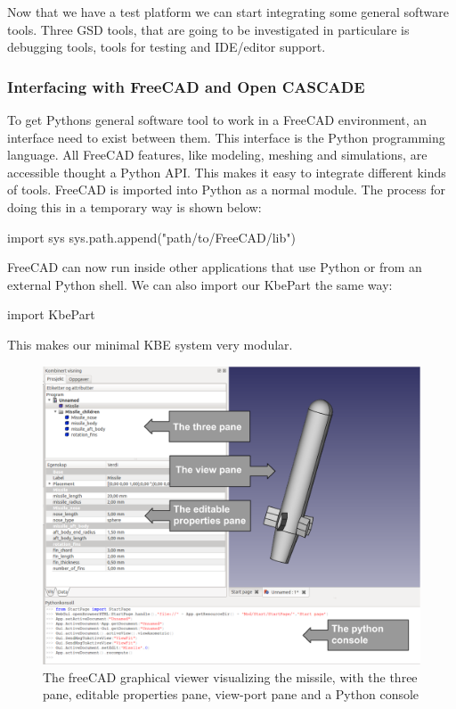 Now that we have a test platform we can start integrating some general software tools. Three GSD tools, that are going to be investigated in particulare is debugging tools, tools for testing and IDE/editor support.


\subsubsection{Interfacing with FreeCAD and Open CASCADE} %
\label{ssub:Interfacing with FreeCAD}

To get Pythons general software tool to work in a FreeCAD environment, an interface need to exist between them. This interface is the Python programming language. All FreeCAD features, like modeling, meshing and simulations, are accessible thought a Python API. This makes it easy to integrate different kinds of tools. FreeCAD is imported into Python as a normal module. The process for doing this in a temporary way is shown below:

\begin{python}
import sys sys.path.append("path/to/FreeCAD/lib")
\end{python}

FreeCAD can now run inside other applications that use Python or from an external Python shell. We can also import our KbePart the same way:

\begin{python}
import KbePart
\end{python}

This makes our minimal KBE system very modular.

\begin{figure}[ht!]
\centering
\includegraphics[width=120mm]{gfx/freecad_visulization.png}

\caption{The freeCAD graphical viewer visualizing the missile, with the three pane, editable properties pane, view-port pane and a Python console}
\label{fig:freecad}
\end{figure}


